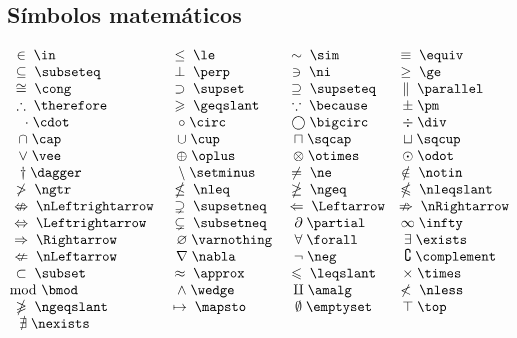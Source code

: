 \subsection{S\'{i}mbolos matem\'{a}ticos}
\begin{equation*}
    \begin{matrix}
    \in \; \verb|\in             | & \le \; \verb|\le        | & \sim \; \verb|\sim      | & \equiv \; \verb|\equiv      | \\ 
    \subseteq \; \verb|\subseteq       | & \perp \; \verb|\perp      | & \ni \; \verb|\ni       | & \ge \; \verb|\ge         | \\ 
    \cong \; \verb|\cong           | & \supset \; \verb|\supset    | & \supseteq \; \verb      |\supseteq | & \parallel \; \verb|\parallel   | \\ 
    \therefore \; \verb|\therefore      | & \geqslant \; \verb|\geqslant  | & \because \; \verb|\because  | & \pm\; \verb|\pm         | \\ 
    \cdot \; \verb|\cdot          | & \circ \; \verb|\circ      | & \bigcirc \; \verb|\bigcirc  | & \div\; \verb|\div        | \\ 
    \cap \; \verb|\cap            | & \cup \; \verb|\cup       | & \sqcap \; \verb|\sqcap    | & \sqcup \; \verb|\sqcup      | \\ 
    \vee\; \verb|\vee            | & \oplus \; \verb|\oplus     | & \otimes \; \verb|\otimes   | & \odot \; \verb|\odot       | \\ 
    \dagger \; \verb|\dagger         | & \setminus\; \verb|\setminus  | & \ne \; \verb|\ne       | & \notin \; \verb|\notin      | \\ 
    \ngtr \; \verb|\ngtr           | & \nleq\; \verb|\nleq      | & \ngeq\; \verb|\ngeq     | & \nleqslant \; \verb|\nleqslant  | \\ 
    \nLeftrightarrow \; \verb|\nLeftrightarrow| & \supsetneq \; \verb|\supsetneq | & \Leftarrow\; \verb|\Leftarrow| & \nRightarrow\; \verb|\nRightarrow| \\ 
    \Leftrightarrow \; \verb|\Leftrightarrow | & \subsetneq \; \verb|\subsetneq | & \partial \; \verb|\partial  | & \infty\; \verb|\infty      | \\ 
    \Rightarrow\; \verb|\Rightarrow     | & \varnothing \; \verb|\varnothing| & \forall \; \verb|\forall   | & \exists \; \verb|\exists     | \\ 
    \nLeftarrow\; \verb|\nLeftarrow     | & \nabla\; \verb|\nabla     | & \neg \; \verb|\neg      | & \complement \; \verb|\complement | \\
    \subset \; \verb|\subset         | & \approx \; \verb|\approx    | & \leqslant \; \verb|\leqslant | & \times \; \verb|\times      |\\
    \bmod\; \verb|\bmod           | & \wedge\; \verb|\wedge     | & \amalg\; \verb|\amalg    | & \nless \; \verb|\nless      | \\
    \ngeqslant \; \verb|\ngeqslant      | & \mapsto \; \verb|\mapsto    | & \emptyset \; \verb|\emptyset | & \top\; \verb|\top        | \\
    \nexists \; \verb|\nexists        | & & & 
    \end{matrix} 
\end{equation*}

